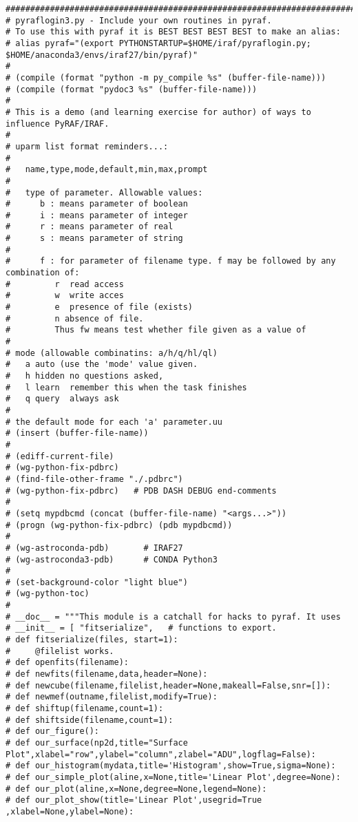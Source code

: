 {\color{darkred}
\begingroup \fontsize{10pt}{10pt}
\selectfont
\begin{verbatim} 
############################################################################
# pyraflogin3.py - Include your own routines in pyraf.
# To use this with pyraf it is BEST BEST BEST BEST to make an alias:
# alias pyraf="(export PYTHONSTARTUP=$HOME/iraf/pyraflogin.py; $HOME/anaconda3/envs/iraf27/bin/pyraf)"
#
# (compile (format "python -m py_compile %s" (buffer-file-name)))
# (compile (format "pydoc3 %s" (buffer-file-name)))
#
# This is a demo (and learning exercise for author) of ways to influence PyRAF/IRAF.
#
# uparm list format reminders...:
#
#   name,type,mode,default,min,max,prompt
#
#   type of parameter. Allowable values:
#      b : means parameter of boolean
#      i : means parameter of integer
#      r : means parameter of real
#      s : means parameter of string
#
#      f : for parameter of filename type. f may be followed by any combination of:
#         r  read access
#         w  write acces
#         e  presence of file (exists)
#         n absence of file.
#         Thus fw means test whether file given as a value of
#
# mode (allowable combinatins: a/h/q/hl/ql)
#   a auto (use the 'mode' value given.
#   h hidden no questions asked,
#   l learn  remember this when the task finishes
#   q query  always ask
#
# the default mode for each 'a' parameter.uu
# (insert (buffer-file-name))
#
# (ediff-current-file)
# (wg-python-fix-pdbrc)
# (find-file-other-frame "./.pdbrc")
# (wg-python-fix-pdbrc)   # PDB DASH DEBUG end-comments
#
# (setq mypdbcmd (concat (buffer-file-name) "<args...>"))
# (progn (wg-python-fix-pdbrc) (pdb mypdbcmd))
#
# (wg-astroconda-pdb)       # IRAF27
# (wg-astroconda3-pdb)      # CONDA Python3
#
# (set-background-color "light blue")
# (wg-python-toc)
#
# __doc__ = """This module is a catchall for hacks to pyraf. It uses
# __init__ = [ "fitserialize",   # functions to export.
# def fitserialize(files, start=1):
#     @filelist works.
# def openfits(filename):
# def newfits(filename,data,header=None):
# def newcube(filename,filelist,header=None,makeall=False,snr=[]):
# def newmef(outname,filelist,modify=True):
# def shiftup(filename,count=1):
# def shiftside(filename,count=1):
# def our_figure():
# def our_surface(np2d,title="Surface Plot",xlabel="row",ylabel="column",zlabel="ADU",logflag=False):
# def our_histogram(mydata,title='Histogram',show=True,sigma=None):
# def our_simple_plot(aline,x=None,title='Linear Plot',degree=None):
# def our_plot(aline,x=None,degree=None,legend=None):
# def our_plot_show(title='Linear Plot',usegrid=True ,xlabel=None,ylabel=None):

\end{verbatim}}
